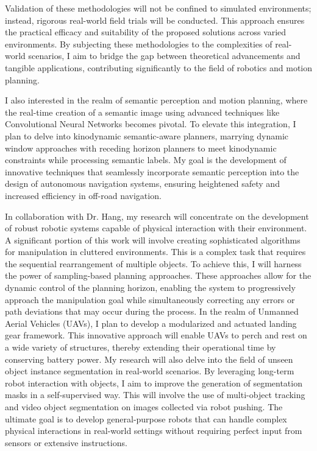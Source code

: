 \documentclass[a4,20pt]{article}
\begin{document}
\begin{large}
Validation of these methodologies will not be confined to simulated environments; instead, rigorous real-world field trials will be conducted. This approach ensures the practical efficacy and suitability of the proposed solutions across varied environments. By subjecting these methodologies to the complexities of real-world scenarios, I aim to bridge the gap between theoretical advancements and tangible applications, contributing significantly to the field of robotics and motion planning.



I also interested in the realm of semantic perception and motion planning, where the real-time creation of a semantic image using advanced techniques like Convolutional Neural Networks becomes pivotal. To elevate this integration, I plan to delve into kinodynamic semantic-aware planners, marrying dynamic window approaches with receding horizon planners to meet kinodynamic constraints while processing semantic labels. My goal is the development of innovative techniques that seamlessly incorporate semantic perception into the design of autonomous navigation systems, ensuring heightened safety and increased efficiency in off-road navigation.



In collaboration with Dr. Hang, my research will concentrate on the development of robust robotic systems capable of physical interaction with their environment. A significant portion of this work will involve creating sophisticated algorithms for manipulation in cluttered environments. This is a complex task that requires the sequential rearrangement of multiple objects. To achieve this, I will harness the power of sampling-based planning approaches. These approaches allow for the dynamic control of the planning horizon, enabling the system to progressively approach the manipulation goal while simultaneously correcting any errors or path deviations that may occur during the process. In the realm of Unmanned Aerial Vehicles (UAVs), I plan to develop a modularized and actuated landing gear framework. This innovative approach will enable UAVs to perch and rest on a wide variety of structures, thereby extending their operational time by conserving battery power. My research will also delve into the field of unseen object instance segmentation in real-world scenarios. By leveraging long-term robot interaction with objects, I aim to improve the generation of segmentation masks in a self-supervised way. This will involve the use of multi-object tracking and video object segmentation on images collected via robot pushing. The ultimate goal is to develop general-purpose robots that can handle complex physical interactions in real-world settings without requiring perfect input from sensors or extensive instructions.



\end{large}
\end{document}
